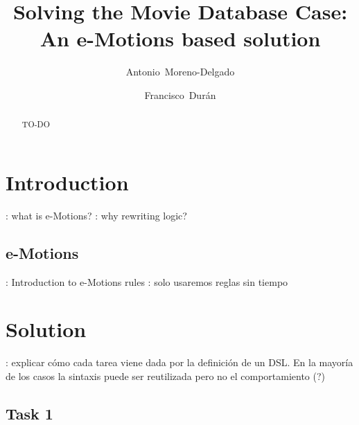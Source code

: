 \documentclass[draft]{llncs}
\newcommand{\todo}[1]{\textbf{\color{red}{TO-DO}}: #1}
\begin{document}
\pagestyle{headings} %

\title{Solving the Movie Database Case: An e-Motions based solution}

\author{Antonio~Moreno-Delgado \and Francisco~Dur\'an}



\maketitle

\begin{abstract}
TO-DO
\end{abstract}

\section{Introduction}\label{sec:intro}

\todo{what is e-Motions?}
\todo{why rewriting logic?}

\subsection{e-Motions}\label{sub:emotions}
\todo{Introduction to e-Motions rules}
\todo{solo usaremos reglas sin tiempo}
\section{Solution}\label{sec:solution}
\todo{explicar cómo cada tarea viene dada por la definición de un DSL. En la mayoría de los casos la sintaxis puede ser reutilizada pero no el comportamiento (?)}
\subsection{Task 1}\label{sub:task1}
\end{document}
